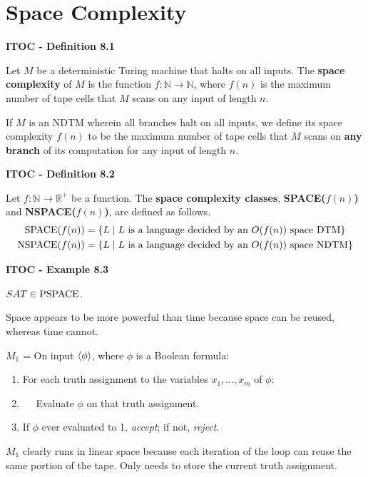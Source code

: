 \section{Space Complexity}

\begin{shaded}
\textbf{ITOC - Definition 8.1}

\medskip
Let $M$ be a deterministic Turing machine that halts on all inputs. The \textbf{space complexity} of $M$ is the function $f:\mathbb{N} \rightarrow \mathbb{N}$, where $f(n)$ is the maximum number of tape cells that $M$ scans on any input of length $n$. 

If $M$ is an NDTM wherein all branches halt on all inputs, we define its space complexity $f(n)$ to be the maximum number of tape cells that $M$ scans on \textbf{any branch} of its computation for any input of length $n$.
\end{shaded}

\begin{shaded}
\textbf{ITOC - Definition 8.2}

\medskip
Let $f:\mathbb{N} \rightarrow \mathbb{R}^+$ be a function. The \textbf{space complexity classes}, \textbf{SPACE($f(n)$)} and \textbf{NSPACE($f(n)$)}, are defined as follows.
\begin{align*}
\text{SPACE}(f(n)) &= \{ L \mid \text{$L$ is a language decided by an $O(f(n))$ space DTM} \} \\
\text{NSPACE}(f(n)) &= \{ L \mid \text{$L$ is a language decided by an $O(f(n))$ space NDTM} \}
\end{align*}
\end{shaded}

\label{lang:SAT_PSAPCE}
\begin{shaded}
\textbf{ITOC - Example 8.3}

\medskip
$SAT \in \text{PSPACE}$.
\end{shaded} 
Space appears to be more powerful than time because space can be reused, whereas time cannot.

\begin{mdframed}
$M_1$ = On input $\langle{\phi}\rangle$, where $\phi$ is a Boolean formula:
\begin{enumerate}
\item For each truth assignment to the variables $x_1, \ldots, x_m$ of $\phi$:
\item $\quad$ Evaluate $\phi$ on that truth assignment.
\item If $\phi$ ever evaluated to 1, \textit{accept}; if not, \textit{reject}.
\end{enumerate}

$M_1$ clearly runs in linear space because each iteration of the loop can reuse the same portion of the  tape. Only needs to store the current truth assignment.
\end{mdframed}

